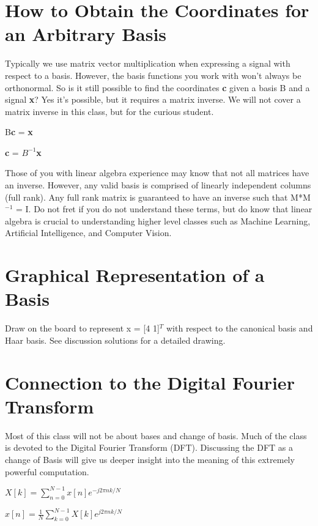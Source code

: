 \documentclass[11pt]{article}
\begin{document}
\section{How to Obtain the Coordinates for an Arbitrary Basis}
Typically we use matrix vector multiplication when expressing a signal with respect to a basis. However, the basis functions you work with won't always be orthonormal. So is it still possible to find the coordinates \textbf{c} given a basis B and a signal \textbf{x}? Yes it's possible, but it requires a matrix inverse. We will not cover a matrix inverse in this class, but for the curious student.

\begin{center}
B\textbf{c} = \textbf{x} 
\end{center}

\begin{center}
\textbf{c} = $B^{-1}$\textbf{x} 
\end{center}

Those of you with linear algebra experience may know that not all matrices have an inverse. However, any valid basis is comprised of linearly independent columns (full rank). Any full rank matrix is guaranteed to have an inverse such that M*M$^{-1}$ = I. Do not fret if you do not understand these terms, but do know that linear algebra is crucial to understanding higher level classes such as Machine Learning, Artificial Intelligence, and Computer Vision.

\section{Graphical Representation of a Basis}

Draw on the board to represent x = [4 1]$^T$ with respect to the canonical basis and Haar basis. See discussion solutions for a detailed drawing.


\section{Connection to the Digital Fourier Transform}

Most of this class will not be about bases and change of basis. Much of the class is devoted to the Digital Fourier Transform (DFT). Discussing the DFT as a change of Basis will give us deeper insight into the meaning of this extremely powerful computation. 

\vspace{2mm}
\begin{center}

$
X[k] =  \sum_{n = 0}^{N-1} x[n]  e^{-j 2\pi nk/N}
$

\end{center}
\vspace{3mm}
\begin{center}

$
x[n] =\frac{1}{{N}} \sum_{k = 0}^{N-1} X[k]  e^{j 2\pi nk/N}
$

\end{center}
\end{document}
